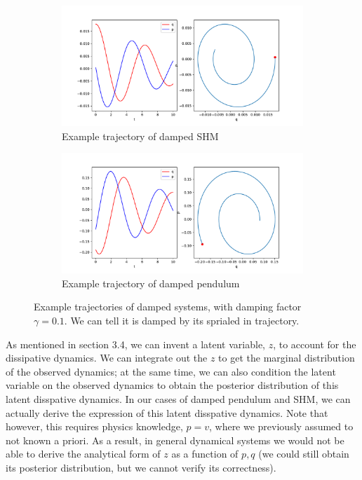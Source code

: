 \documentclass{statsmsc}
\begin{document}
\begin{figure}[H]
     \centering
     \begin{subfigure}[b]{\linewidth}
        \centering
        \includegraphics[width=0.5\linewidth]{../codes/figures/damped_shm_trajectory_1D.pdf}
        \caption{Example trajectory of damped SHM}
        \label{fig:damped_shm_trajectory}
     \end{subfigure}
     \hfill
     \begin{subfigure}[b]{\linewidth}
        \centering
        \includegraphics[width=0.5\linewidth]{../codes/figures/damped_pendulum_trajectory_1D.pdf}
        \caption{Example trajectory of damped pendulum}
        \label{fig:damped_pendulum_trajectory}
     \end{subfigure}
        \caption{Example trajectories of damped systems, with damping factor $\gamma=0.1$. We can tell it is damped by its sprialed in trajectory.}
        \label{fig:damped_trajectory}
\end{figure}

As mentioned in section 3.4, we can invent a latent variable, $z$, to account for the dissipative dynamics.
We can integrate out the $z$ to get the marginal distribution of the observed dynamics; at the same time, we can also condition the latent variable on the observed dynamics to obtain the posterior distribution of this latent disspative dynamics.
In our cases of damped pendulum and SHM, we can actually derive the expression of this latent disspative dynamics. 
Note that however, this requires physics knowledge, $p=v$, where we previously assumed to not known a priori.
As a result, in general dynamical systems we would not be able to derive the analytical form of $z$ as a function of $p, q$ (we could still obtain its posterior distribution, but we cannot verify its correctness).
\end{document}
